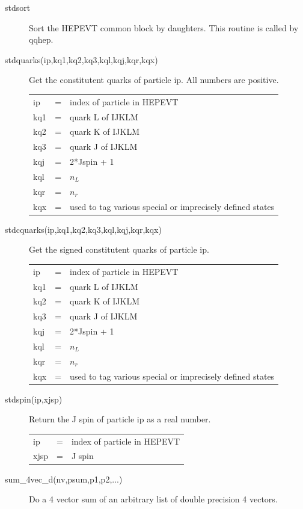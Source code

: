 \begin{description}
\item[stdsort]
 Sort the HEPEVT common block by daughters.
 This routine is called by qqhep.

\item[stdquarks(ip,kq1,kq2,kq3,kql,kqj,kqr,kqx)]
 Get the constitutent quarks of particle ip.
 All numbers are positive.

\begin{tabular}{lcl}
ip  & = & index of particle in HEPEVT \\
kq1 & = &  quark L of IJKLM \\
kq2 & = &  quark K of IJKLM \\
kq3 & = &  quark J of IJKLM \\
kqj & = &  2*Jspin + 1 \\
kql & = &  $n_L$ \\
kqr & = &  $n_r$ \\
kqx & = &  used to tag various special or imprecisely defined states \\
\end{tabular}

\item[stdcquarks(ip,kq1,kq2,kq3,kql,kqj,kqr,kqx)]
 Get the signed constitutent quarks of particle ip.

\begin{tabular}{lcl}
ip  & = & index of particle in HEPEVT \\
kq1 & = &  quark L of IJKLM \\
kq2 & = &  quark K of IJKLM \\
kq3 & = &  quark J of IJKLM \\
kqj & = &  2*Jspin + 1 \\
kql & = &  $n_L$ \\
kqr & = &  $n_r$ \\
kqx & = &  used to tag various special or imprecisely defined states \\
\end{tabular}

\item[stdspin(ip,xjsp)]
 Return the J spin of particle ip as a real number.

\begin{tabular}{lcl}
ip   & = & index of particle in HEPEVT \\
xjsp & = & J spin \\
\end{tabular}

\item[sum\_4vec\_d(nv,psum,p1,p2,...)]
 Do a 4 vector sum of an arbitrary list of double precision 4 vectors.


\end{description}
